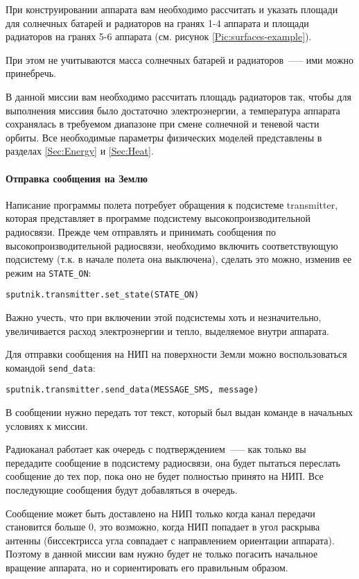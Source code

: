 \documentclass[12pt,a4paper]{article}
\begin{document}
При конструировании аппарата вам необходимо рассчитать и указать площади для
солнечных батарей и радиаторов на гранях 1-4 аппарата и площади радиаторов на гранях 5-6
аппарата (см. рисунок \ref{Pic:surfaces-example}).
  
При этом не учитываются масса солнечных батарей и радиаторов~--— ими можно принебречь. 

В данной миссии вам необходимо рассчитать площадь радиаторов так, чтобы для выполнения
миссиия было достаточно электроэнергии, а температура аппарата сохранялась в требуемом
диапазоне при смене солнечной и теневой части орбиты. Все необходимые параметры физических
моделей представлены в разделах \ref{Sec:Energy} и \ref{Sec:Heat}.

\paragraph{Отправка сообщения на Землю}

Написание программы полета потребует обращения к подсистеме transmitter, которая
представляет в программе подсистему высокопроизводительной радиосвязи. Прежде чем
отправлять и принимать сообщения по высокопроизводительной радиосвязи, необходимо включить
соответствующую подсистему (т.к. в начале полета она выключена), сделать это можно,
изменив ее режим на \verb'STATE_ON':

\begin{verbatim}
sputnik.transmitter.set_state(STATE_ON)
\end{verbatim}

Важно учесть, что при включении этой подсистемы хоть и незначительно, увеличивается расход
электроэнергии и тепло, выделяемое внутри аппарата.

Для отправки сообщения на НИП на поверхности Земли можно воспользоваться командой
\verb'send_data':

\begin{verbatim}
sputnik.transmitter.send_data(MESSAGE_SMS, message)
\end{verbatim}

В сообщении нужно передать тот текст, который был выдан команде в начальных условиях к
миссии.

Радиоканал работает как очередь с подтверждением~--— как только вы передадите сообщение в
подсистему радиосвязи, она будет пытаться переслать сообщение до тех пор, пока оно не
будет полностью принято на НИП. Все последующие сообщения будут добавляться в очередь.

Сообщение может быть доставлено на НИП только когда канал передачи становится больше 0,
это возможно, когда НИП попадает в угол раскрыва антенны (биссектрисса угла совпадает с
направлением ориентации аппарата). Поэтому в данной миссии вам нужно будет не только
погасить начальное вращение аппарата, но и сориентировать его правильным образом.
\end{document}
